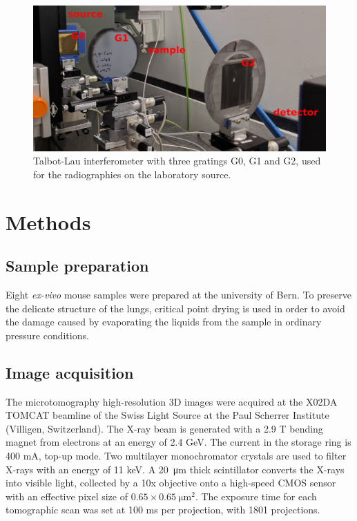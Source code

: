 \begin{figure}[htb]
    \centering
    \includegraphics[width=0.70\columnwidth]{gfx/lung-paper-figures/lung-setup/lung-setup}
    \caption[Photo of the Talbot-Lau interferometer for lung radiographies]{Talbot-Lau interferometer with three gratings G0, G1 and G2, used for
        the radiographies on the laboratory source.
        {\label{248327}}%
    }
\end{figure}

\section{Methods}\label{sec:methods}
\subsection{Sample preparation}
Eight \emph{ex-vivo} mouse samples were prepared at the university of Bern.
To preserve the delicate structure of the lungs, critical point
drying is used in order to avoid the damage caused by evaporating the liquids
from the sample in ordinary pressure conditions.

\subsection{Image acquisition}\label{sec:acquisition}
The microtomography high-resolution 3D images were acquired at the X02DA
TOMCAT beamline of the Swiss Light Source at the Paul Scherrer Institute
(Villigen, Switzerland). The X-ray beam is generated with a 2.9 T bending
magnet from electrons at an energy of 2.4 GeV. The current in the storage
ring is 400 mA, top-up mode. Two multilayer monochromator crystals are used
to filter X-rays with an energy of 11 keV. A \SI{20}{\micro\meter} thick scintillator
converts the X-rays into visible light, collected by a 10x objective onto a
high-speed CMOS sensor with an effective pixel size of $0.65 \times
\SI{0.65}{\micro\meter\squared}$. The exposure time for each tomographic
scan was set at 100 ms per projection, with 1801 projections.

